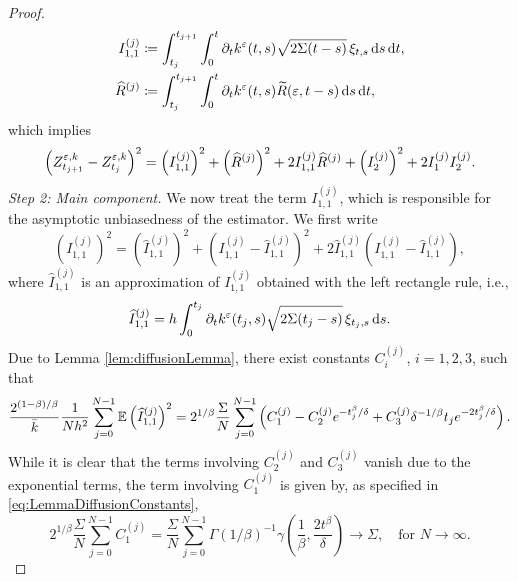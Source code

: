 \documentclass[10pt]{article}
\begin{document}
\begin{proof}
\begin{equation}	
\begin{aligned}
	I_{1,1}^{(j)} &\coloneqq \int_{t_j}^{t_{j+1}}\int_0^t \partial_t k^\varepsilon(t, s)\sqrt{2\Sigma(t-s)} \, \xi_{t,s} \,\mathrm{d} s \,\mathrm{d} t, \\
	\widehat R^{(j)} &\coloneqq \int_{t_j}^{t_{j+1}}\int_0^t \partial_t k^\varepsilon(t, s)\widetilde R(\varepsilon, t - s)\,\mathrm{d} s \,\mathrm{d} t,
\end{aligned}
\end{equation}
which implies
\begin{equation}
	\left(Z^{\varepsilon,k}_{t_{j+1}} - Z^{\varepsilon,k}_{t_j}\right)^2 = \left(I_{1,1}^{(j)}\right)^2 + \left(\widehat R^{(j)}\right)^2 + 2 I_{1,1}^{(j)} \widehat R^{(j)} + \left(I_2^{(j)}\right)^2 + 2I_1^{(j)}I_2^{(j)}.
\end{equation}
\textit{Step 2: Main component.} We now treat the term $I_{1,1}^{(j)}$, which is responsible for the asymptotic unbiasedness of the estimator. We first write
\begin{equation}
	\left(I_{1,1}^{(j)}\right)^2 = \left(\widehat I_{1,1}^{(j)} \right)^2 + \left(I_{1,1}^{(j)} - \widehat I_{1,1}^{(j)}\right)^2  + 2 \widehat I_{1,1}^{(j)} \left(I_{1,1}^{(j)} - \widehat I_{1,1}^{(j)}\right),
\end{equation}
where $\widehat I_{1,1}^{(j)}$ is an approximation of $I_{1,1}^{(j)}$ obtained with the left rectangle rule, i.e.,
\begin{equation}
	\widehat I_{1,1}^{(j)} = h \int_0^{t_j} \partial_t k^\varepsilon(t_j, s)\sqrt{2\Sigma(t_j-s)} \, \xi_{t_j,s} \,\mathrm{d} s.
\end{equation}
Due to Lemma \ref{lem:diffusionLemma}, there exist constants $C_i^{(j)}$, $i=1,2,3$, such that
\begin{equation}
	\frac{2^{(1-\beta)/\beta}}{\bar k} \frac1{Nh^2} \sum_{j=0}^{N-1} \operatorname{\mathbb{E}} \left(\widehat I_{1,1}^{(j)} \right)^2 = 2^{1/\beta} \frac{\Sigma}{N} \sum_{j=0}^{N-1} \left( C_1^{(j)} - C_2^{(j)}e^{-t_j^\beta/\delta} + C_3^{(j)}\delta^{-1/\beta} t_j e^{-2t_j^\beta / \delta} \right).
\end{equation}
While it is clear that the terms involving $C_2^{(j)}$ and $C_3^{(j)}$ vanish due to the exponential terms, the term involving $C_1^{(j)}$ is given by, as specified in \eqref{eq:LemmaDiffusionConstants},
\begin{equation}
	2^{1/\beta} \frac{\Sigma}{N} \sum_{j=0}^{N-1} C_1^{(j)} = \frac{\Sigma}{N} \sum_{j=0}^{N-1} \Gamma(1/\beta)^{-1} \gamma\left(\frac1\beta, \frac{2t^\beta}{\delta}\right) \to \Sigma, \quad \text{for } N \to \infty.

\end{equation}
\end{proof}
\end{document}

